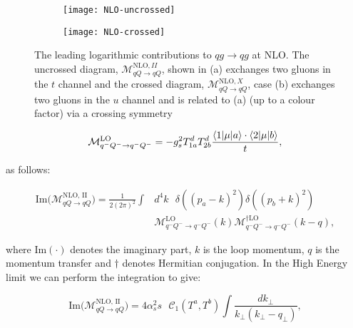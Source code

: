		\begin{figure}[tpb]

			\centering
			\begin{subfigure}[b]{0.48\textwidth}
				\texttt{[image: NLO-uncrossed]}
				\caption{}
				\label{fig:NLO-uncrossed}
			\end{subfigure}
			\begin{subfigure}[b]{0.48\textwidth}
				\texttt{[image: NLO-crossed]}
				\caption{}
				\label{fig:NLO-crossed}
			\end{subfigure}
			\caption{The leading logarithmic contributions to $qg\rightarrow qg$ at NLO.  The uncrossed
 			         diagram, $\mathcal{M}_{qQ\rightarrow qQ}^{\text{NLO}, II}$, shown in (a) exchanges
 			         two gluons in the $t$ channel and the crossed diagram,
 			         $\mathcal{M}_{qQ\rightarrow qQ}^{\text{NLO}, X}$, case (b) exchanges two gluons
 			         in the $u$ channel and is related to (a) (up to a colour factor) via a crossing
 			         symmetry}
			\label{fig:NLO-leadingContrib}
		\end{figure}

		\begin{equation}
			\mathcal{M}_{q^-Q^-\rightarrow q^-Q^-}^{\text{LO}} = -g_s^2T^d_{1a}T^d_{2b}\frac{\langle 1 | \mu | a \rangle\cdot\langle 2 | \mu | b \rangle}{t},
		\end{equation}

		as follows:

		\begin{align}
			\text{Im}\Big(\mathcal{M}_{qQ\rightarrow qQ}^{\text{NLO, II}}\Big) = \frac{1}{2(2\pi)^2}\int &d^4k\text{ }\delta((p_a-k)^2)
			\delta((p_b+k)^2)\\ &\mathcal{M}_{q^-Q^-\rightarrow q^-Q^-}^{\text{LO}}(k)
			\mathcal{M}_{q^-Q^-\rightarrow q^-Q^-}^{\dagger\text{LO}}(k-q),
		\end{align}

		where $\text{Im}(\cdot)$ denotes the imaginary part, $k$ is the loop momentum, $q$ is the momentum
		transfer and $\dagger$ denotes Hermitian conjugation.  In the High Energy limit we can perform the
		integration to give:

		\begin{equation}
			\text{Im}\Big(\mathcal{M}_{qQ\rightarrow qQ}^{\text{NLO, II}}\Big) = 4\alpha_s^2 s\text{ }\mathcal{C}_1(T^a,T^b)
			\int \frac{dk_{\perp}}{k_{\perp}(k_{\perp} - q_{\perp})},
		\end{equation}

